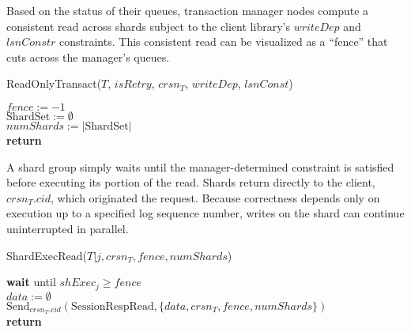 \documentclass{article}
\begin{document}
\par Based on the status of their queues, transaction manager nodes compute a consistent read across shards subject to the client library's $writeDep$ and $lsnConstr$ constraints. This consistent read can be visualized as a ``fence'' that cuts across the manager's queues.\\
\begin{procedure}[H]
  \caption{ReadOnlyTransact($T$, $isRetry$, $crsn_T$, $writeDep$, $lsnConst$)}
  $fence := -1$\\
  $\text{ShardSet} := \emptyset$\\
   
  $numShards := |\text{ShardSet}|$\\
  \textbf{return}
\end{procedure}
\par A shard group simply waits until the manager-determined constraint is satisfied before executing its portion of the read. Shards return directly to the client, $crsn_T.cid$, which originated the request. Because correctness depends only on execution up to a specified log sequence number, writes on the shard can continue uninterrupted in parallel.\\
\begin{procedure}[H]
  \caption{ShardExecRead($T|j, crsn_T, fence, numShards$)}
  \textbf{wait} until $shExec_j \geq fence$\\
  $data := \emptyset$\\
  $\text{Send}_{crsn_{T}.cid }(\text{SessionRespRead}, \{data, crsn_T, fence, numShards\})$\\
  \textbf{return}
\end{procedure}
\end{document}
